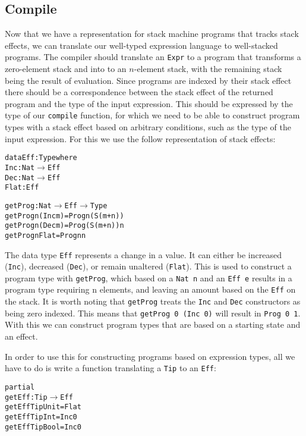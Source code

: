 \subsection{Compile}
Now that we have a representation for stack machine programs that tracks stack effects, we can translate our well-typed expression language to well-stacked programs. The compiler should translate an \texttt{Expr} to a program that transforms a zero-element stack and into to an $n$-element stack, with the remaining stack being the result of evaluation. Since programs are indexed by their stack effect there should be a correspondence between the stack effect of the returned program and the type of the input expression. This should be expressed by the type of our \texttt{compile} function, for which we need to be able to construct program types with a stack effect based on arbitrary conditions, such as the type of the input expression. For this we use the follow representation of stack effects:

\begin{alltt}
data Eff : Type where
	Inc  : Nat \(\rightarrow\)  Eff
	Dec  : Nat \(\rightarrow\)  Eff
	Flat :        Eff

getProg : Nat \(\rightarrow\)  Eff \(\rightarrow\)  Type
getProg n (Inc m) = Prog n (S (m + n))
getProg n (Dec m) = Prog (S (m + n)) n
getProg n Flat    = Prog n n
\end{alltt}

The data type \texttt{Eff} represents a change in a value. It can either be increased (\texttt{Inc}), decreased (\texttt{Dec}), or remain unaltered (\texttt{Flat}). This is used to construct a program type with \texttt{getProg}, which based on a \texttt{Nat n} and an \texttt{Eff e} results in a program type requiring n elements, and leaving an amount based on the \texttt{Eff} on the stack. It is worth noting that \texttt{getProg} treats the \texttt{Inc} and \texttt{Dec} constructors as being zero indexed. This means that \texttt{getProg 0 (Inc 0)} will result in \texttt{Prog 0 1}. With this we can construct program types that are based on a starting state and an effect.

In order to use this for constructing programs based on expression types, all we have to do is write a function translating a \texttt{Tip} to an \texttt{Eff}:

\begin{alltt}
partial
getEff : Tip \(\rightarrow\) Eff
getEff TipUnit = Flat
getEff TipInt  = Inc 0
getEff TipBool = Inc 0
\end{alltt}

